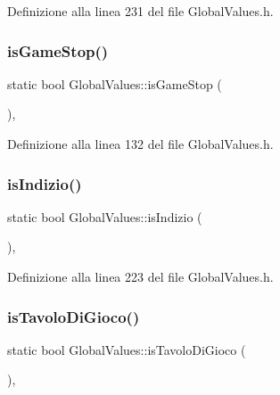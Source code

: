 Definizione alla linea 231 del file Global\+Values.\+h.

\mbox{\label{class_global_values_a9fc6ec73e59accab5200eea5f90d5b95}} 
\subsubsection{\texorpdfstring{is\+Game\+Stop()}{isGameStop()}}
{\footnotesize\ttfamily static bool Global\+Values\+::is\+Game\+Stop (\begin{DoxyParamCaption}{ }\end{DoxyParamCaption})\hspace{0.3cm}{\ttfamily [inline]}, {\ttfamily [static]}}



Definizione alla linea 132 del file Global\+Values.\+h.

\mbox{\label{class_global_values_ac07ccab83df3c844556fc8a57b27af02}} 
\subsubsection{\texorpdfstring{is\+Indizio()}{isIndizio()}}
{\footnotesize\ttfamily static bool Global\+Values\+::is\+Indizio (\begin{DoxyParamCaption}{ }\end{DoxyParamCaption})\hspace{0.3cm}{\ttfamily [inline]}, {\ttfamily [static]}}



Definizione alla linea 223 del file Global\+Values.\+h.

\mbox{\label{class_global_values_ad37f4ef2cc7e6f3ecd2e8f504a5ffecb}} 
\subsubsection{\texorpdfstring{is\+Tavolo\+Di\+Gioco()}{isTavoloDiGioco()}}
{\footnotesize\ttfamily static bool Global\+Values\+::is\+Tavolo\+Di\+Gioco (\begin{DoxyParamCaption}{ }\end{DoxyParamCaption})\hspace{0.3cm}{\ttfamily [inline]}, {\ttfamily [static]}}



